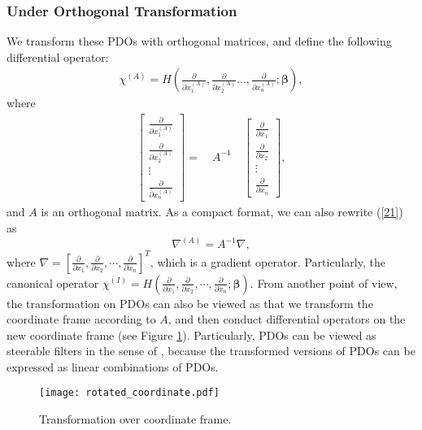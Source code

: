 \documentclass{article}
\begin{document}
\subsubsection{Under Orthogonal Transformation}
We transform these PDOs with orthogonal matrices, and define the following differential operator:
\begin{align}
\chi^{(A)}=H\left(\frac{\partial}{\partial x_1^{(A)}},\frac{\partial}{\partial x_2^{(A)}}\dots,\frac{\partial}{\partial x_n^{(A)} };\bm{\beta}\right),
\label{aa}
\end{align}
where 
\begin{align}
\begin{bmatrix}
\frac{\partial}{\partial x_1^ {(A)}}\\
\frac{\partial}{\partial x_2^ {(A)}}\\
\vdots\\
\frac{\partial}{\partial x_n^{(A)}}
\end{bmatrix}
=\quad A^{-1} \quad
\begin{bmatrix}
\frac{\partial}{\partial x_1}\\
\frac{\partial}{\partial x_2}\\
\vdots\\
\frac{\partial}{\partial x_n}
\end{bmatrix},
\label{21}
\end{align}
and $A$ is an orthogonal matrix. As a compact format, we can also rewrite (\ref{21}) as 
\begin{equation}
\nabla^{(A)} = A^{-1}\nabla \label{compact},
\end{equation}
where $\nabla=[\frac{\partial}{\partial x_1},\frac{\partial}{\partial x_2},\cdots,\frac{\partial}{\partial x_n}]^T$, which is a gradient operator. Particularly, the canonical operator $\chi^{(I)}=H(\frac{\partial}{\partial x_1},\frac{\partial}{\partial x_2},\cdots,\frac{\partial}{\partial x_n};\bm{\beta})$. From another point of view, the transformation on PDOs can also be viewed as that we transform the coordinate frame according to $A$, and then conduct differential operators on the new coordinate frame (see Figure \ref{rotated}). Particularly, PDOs can be viewed as steerable filters in the sense of \cite{helor1996canonical}, because the transformed versions of PDOs can be expressed as linear combinations of PDOs.

\begin{figure}
	\centering
	\texttt{[image: rotated\_coordinate.pdf]} \caption{Transformation over coordinate frame.}
	\label{rotated}
\end{figure}
\end{document}
